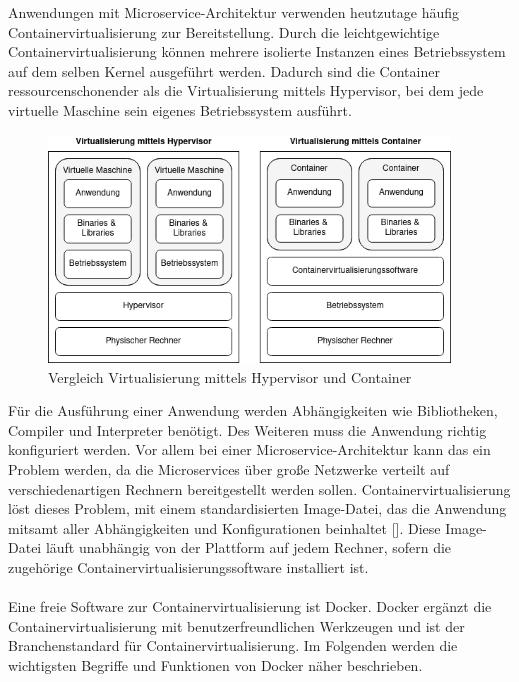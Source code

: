 Anwendungen mit Microservice-Architektur verwenden heutzutage häufig Containervirtualisierung zur Bereitstellung. Durch die leichtgewichtige Containervirtualisierung können mehrere isolierte Instanzen eines Betriebssystem auf dem selben Kernel ausgeführt werden. Dadurch sind die Container ressourcenschonender als die Virtualisierung mittels Hypervisor, bei dem jede virtuelle Maschine sein eigenes Betriebssystem ausführt.

\begin{figure}[H] 
    \centering
    \includegraphics[width=0.95\textwidth]{figures/containervirtualisierung.png}
    \caption{Vergleich Virtualisierung mittels Hypervisor und Container}
\end{figure}

Für die Ausführung einer Anwendung werden Abhängigkeiten wie Bibliotheken, Compiler und Interpreter benötigt. Des Weiteren muss die Anwendung richtig konfiguriert werden. Vor allem bei einer Microservice-Architektur kann das ein Problem werden, da die Microservices über große Netzwerke verteilt auf verschiedenartigen Rechnern bereitgestellt werden sollen. Containervirtualisierung löst dieses Problem, mit einem standardisierten Image-Datei, das die Anwendung mitsamt aller Abhängigkeiten und Konfigurationen beinhaltet [\cite[S. 9]{arundelCloud2019}]. Diese Image-Datei läuft unabhängig von der Plattform auf jedem Rechner, sofern die zugehörige Containervirtualisierungssoftware installiert ist. \\
\\
Eine freie Software zur Containervirtualisierung ist Docker. Docker ergänzt die Containervirtualisierung mit benutzerfreundlichen Werkzeugen  und ist der Branchenstandard für Containervirtualisierung. Im Folgenden werden die wichtigsten Begriffe und Funktionen von Docker näher beschrieben. \\
\\

